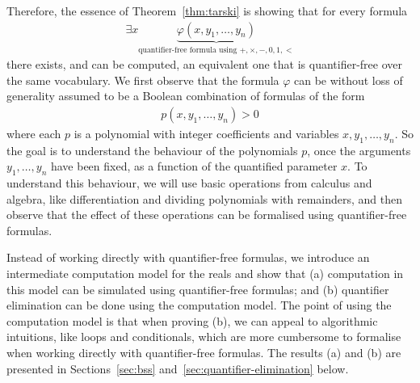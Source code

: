 Therefore, the essence of Theorem~\ref{thm:tarski} is showing that for every
formula 
\begin{align*}
  \exists x \underbrace{\varphi(x,y_1,\ldots,y_n) }_{\text{quantifier-free formula using $+,\times,-,0,1,<$}}
\end{align*}
there exists, and can be computed, an equivalent one that is quantifier-free over the same vocabulary. We first observe that the formula $\varphi$ can be without loss of generality assumed to be a Boolean combination of formulas of the form
\begin{align*}
  p(x,y_1,\ldots,y_n) > 0
\end{align*}
where each $p$ is a polynomial with integer coefficients and variables $x,y_1,\ldots,y_n$. So the goal is to understand the behaviour of the polynomials $p$, once the arguments $y_1,\ldots,y_n$ have been fixed, as a function of the quantified parameter $x$. To understand this behaviour, we will use basic operations from calculus and algebra, like differentiation and dividing polynomials with remainders, and then observe that the effect of these operations can be formalised using quantifier-free formulas. 

Instead of working directly with quantifier-free formulas, we introduce an intermediate computation model for the reals and show that (a) computation in this model can be simulated using quantifier-free formulas; and (b) quantifier elimination can be done using the computation model. The point of using the computation model is that when proving (b), we can appeal to algorithmic intuitions, like loops and conditionals, which are more cumbersome to formalise when working directly with quantifier-free formulas. The results (a) and (b) are presented in Sections~\ref{sec:bss} and~\ref{sec:quantifier-elimination} below.








